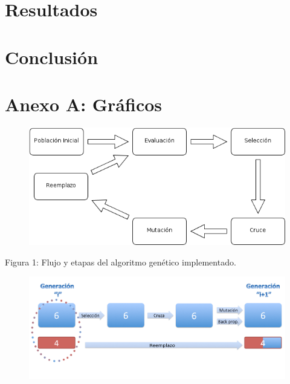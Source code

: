 \documentclass[%
    final,
    reprint,
    notitlepage,
    narroweqnarray,
    inline,
    twoside,
    invited
    ]{ieee}
\begin{document}
\section{Resultados}

\section{Conclusión}




\clearpage
\onecolumn

\section*{Anexo A: Gráficos}


\begin{figure}[H]
\begin{center}
\includegraphics[scale=0.650]{./images/Dibujo1.png}
\label{modelado}
\end{center}
\end{figure}

\begin{center}
\par Figura 1: Flujo y etapas del algoritmo genético implementado.
\end{center}

\begin{figure}[H]
\begin{center}
\includegraphics[scale=1.90]{./images/AlgGenModelado.png}
\label{modelado}
\end{center}
\end{figure}
\end{document}
